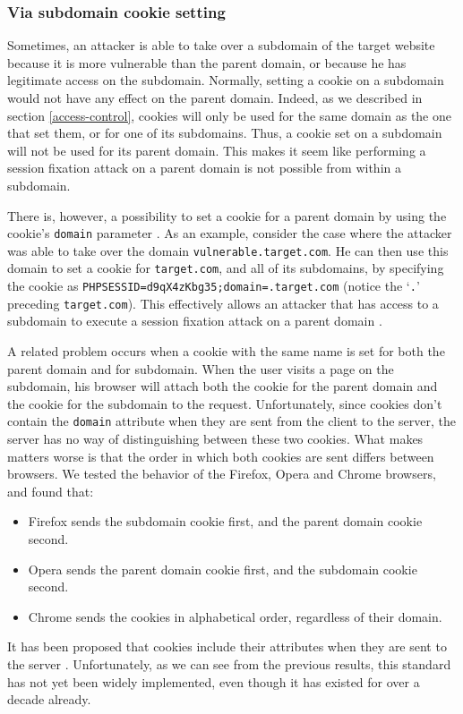 \subsubsection{Via subdomain cookie setting}\label{subdomain-setting}

Sometimes, an attacker is able to take over a subdomain of the target website because it is more vulnerable than the parent domain, or because he has legitimate access on the subdomain. Normally, setting a cookie on a subdomain would not have any effect on the parent domain. Indeed, as we described in section \ref{access-control}, cookies will only be used for the same domain as the one that set them, or for one of its subdomains. Thus, a cookie set on a subdomain will not be used for its parent domain. This makes it seem like performing a session fixation attack on a parent domain is not possible from within a subdomain.

There is, however, a possibility to set a cookie for a parent domain by using the cookie's \texttt{domain} parameter \cite{rfc2109}. As an example, consider the case where the attacker was able to take over the domain \texttt{vulnerable.target.com}. He can then use this domain to set a cookie for \texttt{target.com}, and all of its subdomains, by specifying the cookie as \texttt{PHPSESSID=d9qX4zKbg35;domain=.target.com} (notice the `\texttt{.}' preceding \texttt{target.com}). This effectively allows an attacker that has access to a subdomain to execute a session fixation attack on a parent domain \cite{Kolsek2002}.

A related problem occurs when a cookie with the same name is set for both the parent domain and for subdomain. When the user visits a page on the subdomain, his browser will attach both the cookie for the parent domain and the cookie for the subdomain to the request. Unfortunately, since cookies don't contain the \texttt{domain} attribute when they are sent from the client to the server, the server has no way of distinguishing between these two cookies. What makes matters worse is that the order in which both cookies are sent differs between browsers. We tested the behavior of the Firefox, Opera and Chrome browsers, and found that:
\begin{itemize}
	\item Firefox sends the subdomain cookie first, and the parent domain cookie second.
	\item Opera sends the parent domain cookie first, and the subdomain cookie second.
	\item Chrome sends the cookies in alphabetical order, regardless of their domain.
\end{itemize}
It has been proposed that cookies include their attributes when they are sent to the server \cite{rfc2965}. Unfortunately, as we can see from the previous results, this standard has not yet been widely implemented, even though it has existed for over a decade already.

